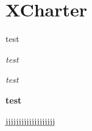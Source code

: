 \switchtobodyfont[xcharter,10pt]
\chapter[xcharter]{XCharter}



{\sc test}

{\it test}

{\sl test}

{\bf test}


jjjjjjjjjjjjjjjjjjj
